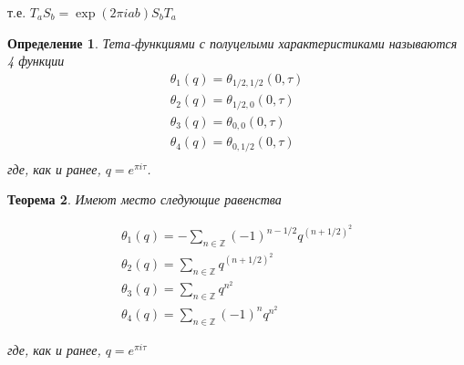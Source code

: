 \documentclass{article}
\newcommand{\ZZ}{\mathbb{Z}}
\theoremstyle{break}
\newtheorem{theorem}{Теорема}[section]
\newtheorem{definition}[theorem]{Определение}
\begin{document}
т.е. $T_a S_b = \exp(2 \pi i a b) S_b T_a$

\begin{definition}
	Тета-функциями с полуцелыми характеристиками называются 4 функции
	\begin{equation}
		\begin{split}
			\theta_1(q)=\theta_{1/2, 1/2}(0, \tau) \\
			\theta_2(q)=\theta_{1/2, 0}(0, \tau) \\
			\theta_3(q)=\theta_{0, 0}(0, \tau) \\
			\theta_4(q)=\theta_{0, 1/2}(0, \tau) \\
		\end{split}
	\end{equation}
	где, как и ранее, $q=e^{\pi i \tau}$.
\end{definition}

\begin{theorem}
Имеют место следующие равенства

\begin{gather*}
	\theta_1(q)=-\sum_{n \in \ZZ} (-1)^{n-1/2}q^{(n+1/2)^2} \\ 
	\theta_2(q)=\sum_{n \in \ZZ} q^{(n+1/2)^2} \\
	\theta_3(q)=\sum_{n \in \ZZ} q^{n^2}	\\
	\theta_4(q)=\sum_{n \in \ZZ} {(-1)^n q^{n^2}}
\end{gather*}

где, как и ранее, $q=e^{\pi i \tau}$

\end{theorem}
\end{document}
